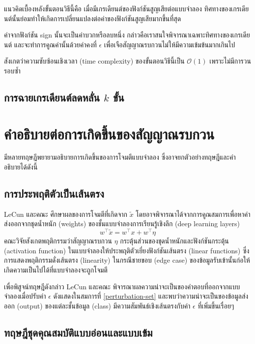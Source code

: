 \documentclass{cpereport}
\begin{document}
แนวคิดเบื้องหลังขั้นตอนวิธีนี้คือ เมื่อมีเกรเดียนต์ของฟังก์ชันสูญเสียต่อแบบจำลอง ทิศทางของเกรเดียนต์นั้นย่อมทำให้เกิดการเปลี่ยนแปลงต่อค่าของฟังก์ชันสูญเสียมากขึ้นที่สุด 

ค่าจากฟังก์ชัน sign นั้นจะเป็นค่าบวกหรือลบหนึ่ง กล่าวคือเราสนใจพิจารณาเฉพาะทิศทางของเกรเดียนต์ และจะทำการคูณค่านั้นด้วยค่าคงที่ $\epsilon$ เพื่อเจือสัญญาณรบกวนไม่ให้มีความเข้มข้นมากเกินไป

สังเกตว่าความซับซ้อนเชิงเวลา (time complexity) ของขั้นตอนวิธีนี้เป็น $\mathcal{O}(1)$ เพราะไม่มีการวนรอบซ้ำ

\subsection{การฉายเกรเดียนต์ลดหลั่น $k$ ขั้น}

\section{คำอธิบายต่อการเกิดขึ้นของสัญญาณรบกวน}

มีหลายทฤษฎีพยายามอธิบายการเกิดขึ้นของการโจมตีแบบจำลอง ซึ่งอาจยกตัวอย่างทฤษฎีและคำอธิบายได้ดังนี้

\subsection{การประพฤติตัวเป็นเส้นตรง}
LeCun และคณะ \cite{1412.6572} ศึกษาผลของการโจมตีที่เกิดจาก $\tilde{x}$ โดยอาจพิจารณาได้จากการคูณสมการเพื่อหาค่าส่งออกจากชุดน้ำหนัก (weights) ของชั้นแบบจำลองการเรียนรู้เชิงลึก (deep learning layers) 
\begin{equation}
    w^\top\tilde{x} = w^\top x + w^\top \eta
\end{equation}
คณะวิจัยสังเกตพฤติกรรมว่าสัญญาณรบกวน $\eta$ กระตุ้นส่วนของชุดน้ำหนักและฟังก์ชันกระตุ้น (activation function) ในแบบจำลองให้ประพฤติตัวเยี่ยงฟังก์ชันเส้นตรง (linear functions) ซึ่งการแสดงพฤติกรรมดั่งเส้นตรง (linearity) ในกรณีชายขอบ (edge case) ของข้อมูลรับเข้านั้นก่อให้เกิดความเป็นไปได้ที่แบบจำลองจะถูกโจมตี

เพื่อพิสูจน์ทฤษฎีดังกล่าว LeCun และคณะ พิจารณาผลความน่าจะเป็นของคำตอบที่ออกจากแบบจำลองเมื่อปรับค่า $\epsilon$ ดังแสดงในสมการที่ \ref{perturbation-set} และพบว่าความน่าจะเป็นของข้อมูลส่งออก (output) ของแต่ละชั้นข้อมูล (class) มีความสัมพันธ์เชิงเส้นตรงกับค่า $\epsilon$ ที่เพิ่มขึ้นเรื่อยๆ

\subsection{ทฤษฎีชุดคุณสมบัติแบบอ่อนและแบบเข้ม}
\end{document}
